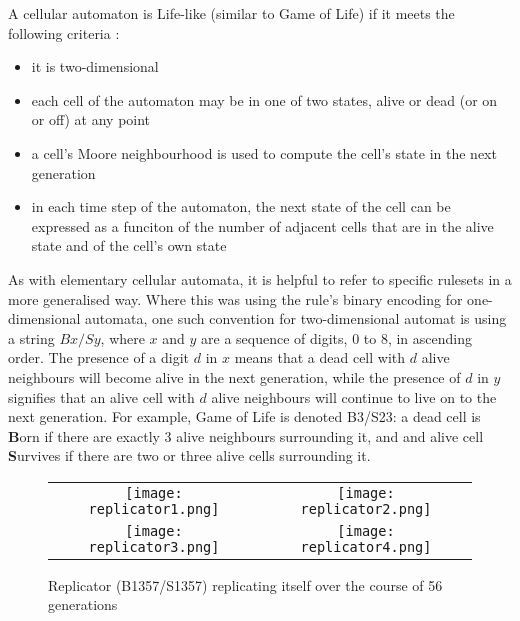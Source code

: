 \documentclass[11pt,a4paper]{article}
\begin{document}
    A cellular automaton is Life-like (similar to Game of Life) if it meets the
    following criteria \cite{LifeLike}:

    \begin{itemize}
        \item it is two-dimensional
        \item each cell of the automaton may be in one of two states, alive or
            dead (or on or off) at any point
        \item a cell's Moore neighbourhood is used to compute the cell's state
            in the next generation
        \item in each time step of the automaton, the next state of the cell can
            be expressed as a funciton of the number of adjacent cells that are
            in the alive state and of the cell's own state
    \end{itemize}

    As with elementary cellular automata, it is helpful to refer to specific
    rulesets in a more generalised way. Where this was using the rule's binary
    encoding for one-dimensional automata, one such convention for
    two-dimensional automat is using a string $Bx/Sy$, where $x$ and $y$ are a
    sequence of digits, 0 to 8, in ascending order. The presence of a digit $d$
    in $x$ means that a dead cell with $d$ alive neighbours will become alive in
    the next generation, while the presence of $d$ in $y$ signifies that an
    alive cell with $d$ alive neighbours will continue to live on to the next
    generation. For example, Game of Life is denoted B3/S23: a dead cell is
    \textbf{B}orn if there are exactly 3 alive neighbours surrounding it, and
    and alive cell \textbf{S}urvives if there are two or three alive cells
    surrounding it.

    \begin{figure}[h]
        \begin{centering}
            \begin{tabular}{cc}
                \texttt{[image: replicator1.png]} &
                \texttt{[image: replicator2.png]} \\
                \texttt{[image: replicator3.png]} &
                \texttt{[image: replicator4.png]} \\
            \end{tabular}
            \caption{Replicator (B1357/S1357) replicating itself over the course of
            56 generations}
        \end{centering}
    \end{figure}
\end{document}
